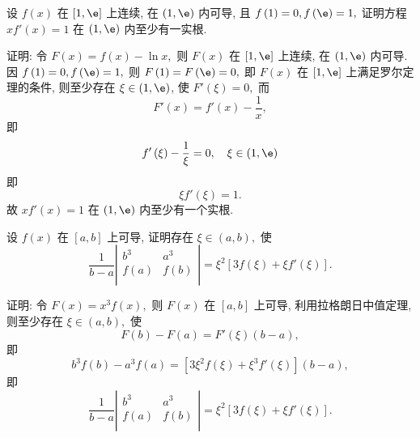 \begin{problem} 设 $f\left( x \right)$ 在 $\left\lbrack 1,\e \right\rbrack$
上连续, 在 $(1,\e)$ 内可导, 且
$f\left( 1 \right) = 0,f\left( \e \right) = 1,$ 证明方程
$xf'\left( x \right) = 1$ 在 $\left( 1,\e \right)$ 内至少有一实根.

\begin{solution}
证明: 令 $F\left( x \right) = f\left( x \right) - \ln x,$ 则
$F\left( x \right)$ 在 $\left\lbrack 1,\e \right\rbrack$ 上连续, 在
$(1,\e)$ 内可导. {因}
$f\left( 1 \right) = 0,f\left( \e \right) = 1,$ {则}
$F\left( 1 \right) = F\left( \e \right) = 0,$ {即}
$F\left( x \right)$ {在} $\left\lbrack 1,\e \right\rbrack$
{上满足罗尔定理的条件, 则至少存在}
$\xi \in \left( 1,\e \right)${, 使} $F'\left( \xi \right) = 0,$
而
$$F'\left( x \right) = f'\left( x \right) - \frac{1}{x},$$
即
$$f'\left( \xi \right) - \frac{1}{\xi} = 0,\quad\xi \in \left( 1,\e \right)$$
即
$$\xi f'\left( \xi \right) = 1.$$
故 $xf'\left( x \right) = 1$ 在 $(1,\e)$ 内至少有一个实根.

\end{solution}



\end{problem}           


\begin{problem} 设 $f\left( x \right)$ 在 $\left\lbrack a,b \right\rbrack$
上可导, 证明存在 $\xi \in \left( a,b \right),$ 使
$$\frac{1}{b - a}\left| \begin{matrix}
b^{3} & a^{3} \\
f\left( a \right) & f\left( b \right) \\
\end{matrix} \right| = \xi^{2}\left\lbrack 3 f\left( \xi \right) + \xi f'\left( \xi \right) \right\rbrack.$$

\begin{solution}
	证明: 令 $F\left( x \right) = x^{3}f\left( x \right),$ 则
$F\left( x \right)$ 在 $\left\lbrack a,b \right\rbrack$ 上可导,
利用拉格朗日中值定理, 则至少存在 $\xi \in \left( a,b \right),$ 使
$$F\left( b \right) - F\left( a \right) = F'\left( \xi \right)\left( b - a \right),$$
即
$$b^{3}f\left( b \right) - a^{3}f\left( a \right) = \left\lbrack 3\xi^{2}f\left( \xi \right) + \xi^{3}f'\left( \xi \right) \right\rbrack\left( b - a \right),$$
即
$$\frac{1}{b - a}\left| \begin{matrix}
b^{3} & a^{3} \\
f\left( a \right) & f\left( b \right) \\
\end{matrix} \right| = \xi^{2}\left\lbrack 3 f\left( \xi \right) + \xi f'\left( \xi \right) \right\rbrack.$$
\end{solution}

\end{problem} 

